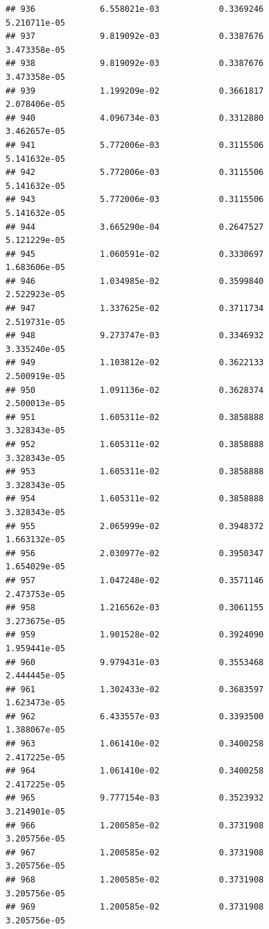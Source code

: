 \documentclass[
]{article}
\begin{document}
\begin{verbatim}
## 936             6.558021e-03            0.3369246            5.210711e-05
## 937             9.819092e-03            0.3387676            3.473358e-05
## 938             9.819092e-03            0.3387676            3.473358e-05
## 939             1.199209e-02            0.3661817            2.078406e-05
## 940             4.096734e-03            0.3312880            3.462657e-05
## 941             5.772006e-03            0.3115506            5.141632e-05
## 942             5.772006e-03            0.3115506            5.141632e-05
## 943             5.772006e-03            0.3115506            5.141632e-05
## 944             3.665290e-04            0.2647527            5.121229e-05
## 945             1.060591e-02            0.3330697            1.683606e-05
## 946             1.034985e-02            0.3599840            2.522923e-05
## 947             1.337625e-02            0.3711734            2.519731e-05
## 948             9.273747e-03            0.3346932            3.335240e-05
## 949             1.103812e-02            0.3622133            2.500919e-05
## 950             1.091136e-02            0.3628374            2.500013e-05
## 951             1.605311e-02            0.3858888            3.328343e-05
## 952             1.605311e-02            0.3858888            3.328343e-05
## 953             1.605311e-02            0.3858888            3.328343e-05
## 954             1.605311e-02            0.3858888            3.328343e-05
## 955             2.065999e-02            0.3948372            1.663132e-05
## 956             2.030977e-02            0.3950347            1.654029e-05
## 957             1.047248e-02            0.3571146            2.473753e-05
## 958             1.216562e-03            0.3061155            3.273675e-05
## 959             1.901528e-02            0.3924090            1.959441e-05
## 960             9.979431e-03            0.3553468            2.444445e-05
## 961             1.302433e-02            0.3683597            1.623473e-05
## 962             6.433557e-03            0.3393500            1.388067e-05
## 963             1.061410e-02            0.3400258            2.417225e-05
## 964             1.061410e-02            0.3400258            2.417225e-05
## 965             9.777154e-03            0.3523932            3.214901e-05
## 966             1.200585e-02            0.3731908            3.205756e-05
## 967             1.200585e-02            0.3731908            3.205756e-05
## 968             1.200585e-02            0.3731908            3.205756e-05
## 969             1.200585e-02            0.3731908            3.205756e-05

\end{verbatim}
\end{document}
